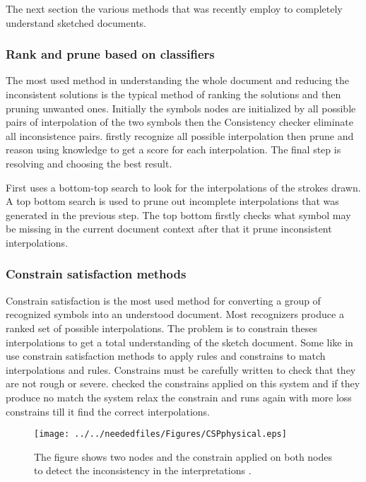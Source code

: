 The next section the various methods that was recently employ to completely understand sketched documents. 

\subsubsection{Rank and prune based on classifiers}
\label{sec:Rankandprunebasedonclassifiers}

The most used method in understanding the whole document and reducing the inconsistent solutions is the typical method of ranking the solutions and then pruning unwanted ones. 
Initially the symbols nodes are initialized by all possible pairs of interpolation of the two symbols then the Consistency checker eliminate all inconsistence pairs. \cite {tobeadd} \cite {geometrydomain49}  firstly recognize all possible interpolation then prune and reason using knowledge to get a score for each interpolation. The final step is resolving and choosing the best result.

 \cite {Alvarado2002Framework11,HierarchicalParsing7}  First uses a bottom-top search to look for the interpolations of the strokes drawn. A top bottom search is used to prune out incomplete interpolations that was generated in the previous step.  The top bottom firstly checks what symbol may be missing in the current document context after that it prune inconsistent interpolations.
\subsubsection{Constrain satisfaction methods}
\label{sec:Constrainsatisfactionmethods}

Constrain satisfaction is the most used method for converting a group of recognized symbols into an understood document. Most recognizers produce a ranked set of possible interpolations. The problem is to constrain theses interpolations to get a total  understanding of the sketch document. Some like in \cite {tobeadd}  use constrain satisfaction methods to apply rules and constrains to match interpolations and rules. Constrains must be carefully written to check that they are not rough or severe. \cite {tobeadd}  checked the constrains applied on this system and if they produce no match the system relax the constrain and runs again with more loss constrains till it find the correct interpolations. 

\begin{figure}
		\texttt{[image: ../../neededfiles/Figures/CSPphysical.eps]}
	\caption[Physical Constrains on Symbols]{ The figure shows two nodes and the constrain applied on both nodes to detect the inconsistency in the interpretations \cite{physicalmeaning6}. }
	\label{fig:CSPphysical}
\end{figure}

